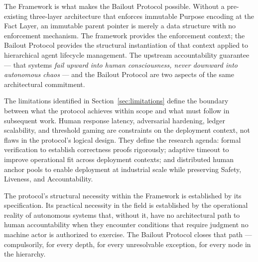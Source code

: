 The \bxthree{} Framework is what makes the Bailout Protocol possible. Without a pre-existing three-layer architecture that enforces immutable Purpose encoding at the Fact Layer, an immutable parent pointer is merely a data structure with no enforcement mechanism. The framework provides the enforcement context; the Bailout Protocol provides the structural instantiation of that context applied to hierarchical agent lifecycle management. The upstream accountability guarantee --- that \bxthree{} systems \emph{fail upward into human consciousness, never downward into autonomous chaos} --- and the Bailout Protocol are two aspects of the same architectural commitment.

The limitations identified in Section~\ref{sec:limitations} define the boundary between what the protocol achieves within scope and what must follow in subsequent work. Human response latency, adversarial hardening, ledger scalability, and threshold gaming are constraints on the deployment context, not flaws in the protocol's logical design. They define the research agenda: formal verification to establish correctness proofs rigorously; adaptive timeout to improve operational fit across deployment contexts; and distributed human anchor pools to enable deployment at industrial scale while preserving Safety, Liveness, and Accountability.

The protocol's structural necessity within the \bxthree{} Framework is established by its specification. Its practical necessity in the field is established by the operational reality of autonomous systems that, without it, have no architectural path to human accountability when they encounter conditions that require judgment no machine actor is authorized to exercise. The Bailout Protocol closes that path --- compulsorily, for every depth, for every unresolvable exception, for every node in the hierarchy.
